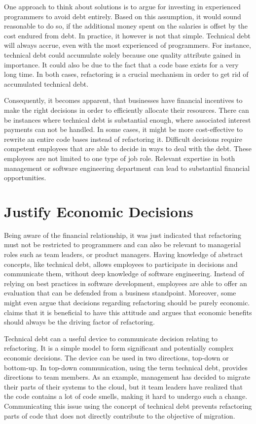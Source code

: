One approach to think about solutions is to argue for investing in experienced programmers to avoid debt entirely. 
Based on this assumption, it would sound reasonable to do so, if the additional money spent on the salaries is offset by the cost endured from debt.
In practice, it however is not that simple. Technical debt will always accrue, even with the most experienced of programmers. For instance, technical debt could accumulate solely because one quality attribute gained in importance. It could also be due to the fact that a code base exists for a very long time. In both cases, refactoring is a crucial mechanism in order to get rid of accumulated technical debt. 

Consequently, it becomes apparent, that businesses have financial incentives to make the right decisions in order to efficiently allocate their resources.
There can be instances where technical debt is substantial enough, 
	where associated interest payments can not be handled. 
In some cases, it might be more cost-effective to 
	rewrite an entire code bases instead of refactoring it.  
Difficult decisions require 
	competent employees that are able to decide in ways to deal with the debt. 
These employees are not limited to one type of job role.
Relevant expertise in both management or software engineering department can lead to substantial financial opportunities.


\section{Justify Economic Decisions}
\label{sec:economic-decisions}
Being aware of the financial relationship, 
	it was just indicated that refactoring must not be restricted to programmers and can also be relevant to managerial roles such as team leaders, or product managers.
Having knowledge of abstract concepts, like technical debt,
	allows employees to participate in decisions and communicate them, without deep knowledge of software engineering.
Instead of relying on best practices in software development, employees are able to offer an evaluation that can be defended from a business standpoint.
Moreover, some might even argue that decisions regarding refactoring should be purely economic. \textcite{fowler2018} claims 
	that it is beneficial to have this attitude and argues that economic benefits
	should always be the driving factor of refactoring.

Technical debt can a useful device to communicate decision relating to refactoring.
It is a simple model to form significant and potentially complex economic decisions.
The device can be used in two directions, top-down or bottom-up.
In top-down communication, using the term technical debt, provides directions to team members.
As an example, management has decided to migrate their parts of their systems to the cloud, 
	but it team leaders have realized that the code contains a lot of code smells, 
	making it hard to undergo such a change. 
Communicating this issue using the concept of technical debt prevents refactoring parts of code 
	that does not directly contribute to the objective of migration.

